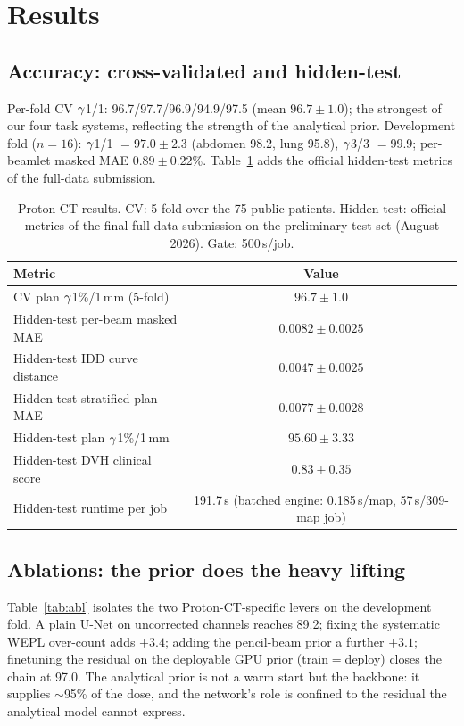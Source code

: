 \documentclass{llncs}
\begin{document}
\section{Results}
\subsection{Accuracy: cross-validated and hidden-test}
Per-fold CV $\gamma$1/1: 96.7/97.7/96.9/94.9/97.5 (mean $\mathbf{96.7\pm1.0}$); the strongest of
our four task systems, reflecting the strength of the analytical prior. Development fold
($n=16$): $\gamma$1/1 $=97.0\pm2.3$ (abdomen 98.2, lung 95.8), $\gamma$3/3 $=99.9$; per-beamlet
masked MAE $0.89\pm0.22$\%. Table~\ref{tab:res} adds the official hidden-test metrics of the
full-data submission.

\begin{table}[t]\centering
\caption{Proton-CT results. CV: 5-fold over the 75 public patients. Hidden test: official
metrics of the final full-data submission on the preliminary test set (August 2026). Gate:
500\,s/job.}\label{tab:res}
\begin{tabular}{@{}lc@{}}\toprule
Metric & Value\\\midrule
CV plan $\gamma$1\%/1\,mm (5-fold) & $96.7\pm1.0$\\
Hidden-test per-beam masked MAE & $0.0082\pm0.0025$\\
Hidden-test IDD curve distance & $0.0047\pm0.0025$\\
Hidden-test stratified plan MAE & $0.0077\pm0.0028$\\
Hidden-test plan $\gamma$1\%/1\,mm & $95.60\pm3.33$\\
Hidden-test DVH clinical score & $0.83\pm0.35$\\
Hidden-test runtime per job & 191.7\,s (batched engine: 0.185\,s/map, 57\,s/309-map job)\\\bottomrule
\end{tabular}\end{table}

\subsection{Ablations: the prior does the heavy lifting}
Table~\ref{tab:abl} isolates the two Proton-CT-specific levers on the development fold. A plain
U-Net on uncorrected channels reaches 89.2; fixing the systematic WEPL over-count adds $+3.4$;
adding the pencil-beam prior a further $+3.1$; finetuning the residual on the deployable GPU
prior (train$=$deploy) closes the chain at 97.0. The analytical prior is not a warm start but
the backbone: it supplies $\sim$95\% of the dose, and the network's role is confined to the
residual the analytical model cannot express.
\end{document}
